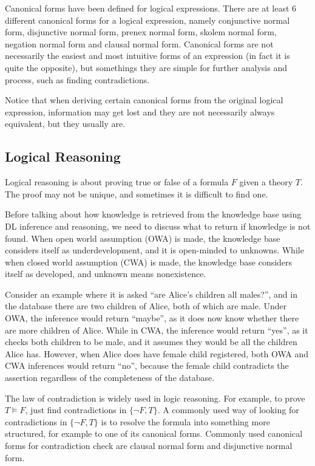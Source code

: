Canonical forms have been defined for logical expressions. There are at least 6 different canonical forms for a logical expression, namely conjunctive normal form, disjunctive normal form, prenex normal form, skolem normal form, negation normal form and clausal normal form. Canonical forms are not necessarily the easiest and most intuitive forms of an expression (in fact it is quite the opposite), but somethings they are simple for further analysis and process, such as finding contradictions.

Notice that when deriving certain canonical forms from the original logical expression, information may get lost and they are not necessarily always equivalent, but they usually are.

\subsection{Logical Reasoning}

Logical reasoning is about proving true or false of a formula $F$ given a theory $T$. The proof may not be unique, and sometimes it is difficult to find one.

Before talking about how knowledge is retrieved from the knowledge base using DL inference and reasoning, we need to discuss what to return if knowledge is not found. When open world assumption (OWA) is made, the knowledge base considers itself as underdevelopment, and it is open-minded to unknowns. While when closed world assumption (CWA) is made, the knowledge base considers itself as developed, and unknown means nonexistence.

Consider an example where it is asked ``are Alice's children all males?'', and in the database there are two children of Alice, both of which are male. Under OWA, the inference would return ``maybe'', as it does now know whether there are more children of Alice. While in CWA, the inference would return ``yes'', as it checks both children to be male, and it assumes they would be all the children Alice has. However, when Alice does have female child registered, both OWA and CWA inferences would return ``no'', because the female child contradicts the assertion regardless of the completeness of the database.

The law of contradiction is widely used in logic reasoning. For example, to prove $T\models F$, just find contradictions in $\{\neg F, T\}$. A commonly used way of looking for contradictions in $\{\neg F, T\}$ is to resolve the formula into something more structured, for example to one of its canonical forms. Commonly used canonical forms for contradiction check are clausal normal form and disjunctive normal form.















